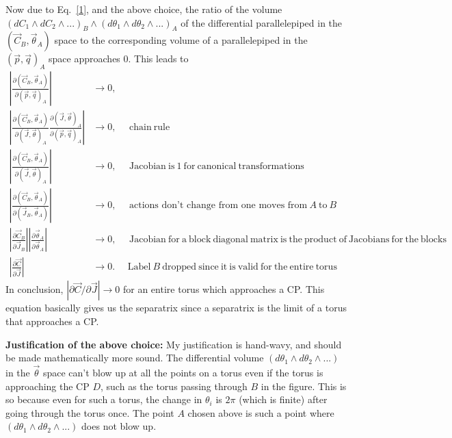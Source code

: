 \documentclass[prd,floatfix,nofootinbib,longbibliography,notitlepage,superscriptaddress]{revtex4-1}
\begin{document}
Now due to Eq.~\ref{1}, and the above choice, the
ratio of the volume 
$(dC_1 \wedge dC_2 \wedge...)_B \wedge
(d \theta_1 \wedge d\theta_2 \wedge...)_A$
of  the differential parallelepiped in the 
$(\vec{C}_B, \vec{\theta}_A)$ space 
to the corresponding volume 
of a parallelepiped in the $(\vec{p}, \vec{q})_A$ space approaches 0.
This leads to
  \begin{align}   
  \left\vert   \frac{\partial (\vec{C}_B, \vec{\theta}_A)}{\partial (\vec{p}, \vec{q})_A} \right\vert & \rightarrow 0,  \\
   \left\vert     \frac{\partial (\vec{C}_B, \vec{\theta}_A)}{\partial (\vec{J}, \vec{\theta})_A}
\frac{{\partial (\vec{J}, \vec{\theta})_A}}{\partial (\vec{p}, \vec{q})_A}  \right\vert  & \rightarrow 0,
~~~~~~\mathrm{chain~rule} \\
 \left\vert    \frac{\partial (\vec{C}_B, \vec{\theta}_A)}{\partial (\vec{J}, \vec{\theta})_A}   \right\vert   &\rightarrow 0, 
 ~~~~~~\mathrm{Jacobian~is~1~for~canonical~transformations}  \\
\left\vert    \frac{\partial (\vec{C}_B, \vec{\theta}_A)}{\partial (\vec{J}_B, \vec{\theta}_A)}   \right\vert &\rightarrow 0, 
  ~~~~~~\text{actions~don't~change~from~one~moves~from}~A~\mathrm{to~}B \\
 \left\vert   \frac{\partial \vec{C}_B}{\partial \vec{J}_B} \right\vert 
   \left\vert    \frac{\partial \vec{\theta}_A}{\partial  \vec{\theta}_A}     \right\vert  &\rightarrow 0, 
   ~~~~~~\mathrm{Jacobian~for~a~block~diagonal~matrix~is~the~product~of~Jacobians~
   for~the~blocks}   \\ 
 \left\vert   \frac{\partial \vec{C}}{\partial \vec{J}}     \right\vert  &    \rightarrow 0.  ~~~~~~\mathrm{Label}~B~\mathrm{dropped~
 since~it~is~valid~for~the~entire~torus }
  \end{align}
In conclusion, $|\partial \vec{C}/\partial \vec{J}| \rightarrow 0$ for an entire torus
which approaches a CP. This equation basically gives us the separatrix since a separatrix
is the limit of a torus that approaches a CP.





\textbf{Justification of the above choice:} My justification is hand-wavy, and should be made mathematically 
more sound. The differential volume
$(d \theta_1 \wedge d\theta_2 \wedge...)$ in the
$\vec{\theta}$ space can't blow up at all the points on a torus even if the 
torus is approaching the CP $D$, such as the torus passing through
$B$ in the figure. This is so because even for such a torus,
the change in $\theta_i$ is $2 \pi$ (which is finite) 
after going through the torus once.
The point $A$ chosen above is such a point where $(d \theta_1 \wedge d\theta_2 \wedge...)$
does not blow up.
\end{document}
